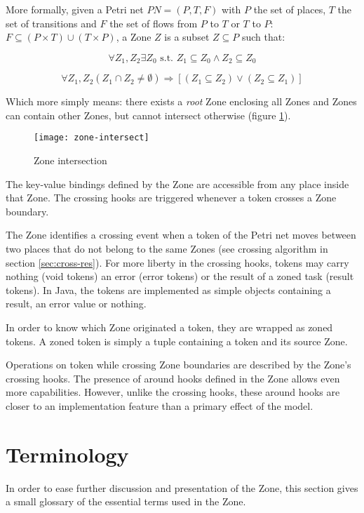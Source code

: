 More formally, given a Petri net $PN = (P, T, F)$ with $P$ the set of places, $T$ the set of transitions and $F$ the set of flows from $P$ to $T$ or $T$ to $P$: $F \subseteq (P \times T) \cup (T \times P)$, a Zone $Z$ is a subset $Z \subseteq P$ such that:

$$\forall Z_1, Z_2 \exists Z_0 \text{ s.t. } Z_1 \subseteq Z_0 \land Z_2 \subseteq Z_0 $$

$$\forall Z_1, Z_2 (Z_1 \cap Z_2 \neq \emptyset) \Rightarrow [(Z_1 \subseteq Z_2) \lor (Z_2 \subseteq Z_1)] $$

Which more simply means: there exists a \emph{root} Zone enclosing all Zones and Zones can contain other Zones, but cannot intersect otherwise (figure \ref{fig:zinter}).

\begin{figure}[h]
  \centering
  \texttt{[image: zone-intersect]}
  \caption{Zone intersection}
  \label{fig:zinter}
\end{figure}

The key-value bindings defined by the Zone are accessible from any place inside that Zone. The crossing hooks are triggered whenever a token crosses a Zone boundary.

The Zone identifies a crossing event when a token of the Petri net moves between two places that do not belong to the same Zones (see crossing algorithm in section \ref{sec:cross-res}). For more liberty in the crossing hooks, tokens may carry nothing (void tokens) an error (error tokens) or the result of a zoned task (result tokens). In Java, the tokens are implemented as simple objects containing a result, an error value or nothing.

In order to know which Zone originated a token, they are wrapped as zoned tokens. A zoned token is simply a tuple containing a token and its source Zone.

Operations on token while crossing Zone boundaries are described by the Zone's crossing hooks.
The presence of around hooks defined in the Zone allows even more capabilities. However, unlike the crossing hooks, these around hooks are closer to an implementation feature than a primary effect of the model.

\section{Terminology}

In order to ease further discussion and presentation of the Zone, this section gives a small glossary of the essential terms used in the Zone.


